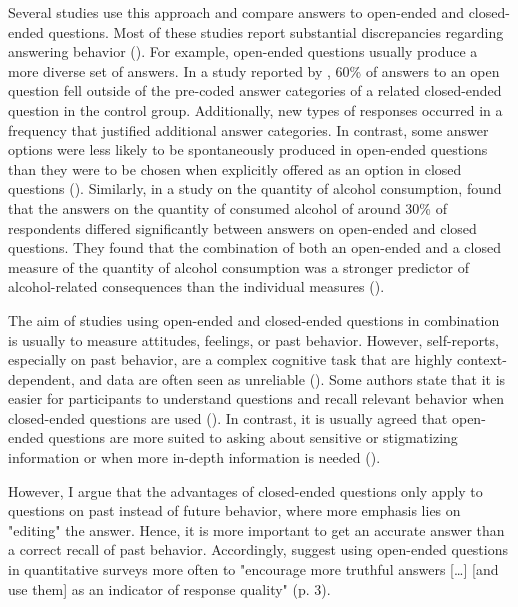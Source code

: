 \documentclass[twocolumn, serif, empirical, authordate]{jote-article}
\begin{document}
Several studies use this approach and compare answers to open-ended and closed-ended questions. Most of these studies report substantial discrepancies regarding answering behavior (). For example, open-ended questions usually produce a more diverse set of answers. In a study reported by \textcite{Schuman1979}, 60\% of answers to an open question fell outside of the pre-coded answer categories of a related closed-ended question in the control group. Additionally, new types of responses occurred in a frequency that justified additional answer categories. In contrast, some answer options were less likely to be spontaneously produced in open-ended questions than they were to be chosen when explicitly offered as an option in closed questions (). Similarly, in a study on the quantity of alcohol consumption, \textcite{Greenfield2006} found that the answers on the quantity of consumed alcohol of around 30\% of respondents differed significantly between answers on open-ended and closed questions. They found that the combination of both an open-ended and a closed measure of the quantity of alcohol consumption was a stronger predictor of alcohol-related consequences than the individual measures ().

The aim of studies using open-ended and closed-ended questions in combination is usually to measure attitudes, feelings, or past behavior.
However, self-reports, especially on past behavior, are a complex cognitive task that are highly context-dependent, and data are often seen as unreliable (). Some authors state that it is easier for participants to understand questions and recall relevant behavior when closed-ended questions are used (). In contrast, it is usually agreed that open-ended questions are more suited to asking about sensitive or stigmatizing information or when more in-depth information is needed ().

However, I argue that the advantages of closed-ended questions only apply to questions on past instead of future behavior, where more emphasis lies on "editing" the answer. Hence, it is more important to get an accurate answer than a correct recall of past behavior.
Accordingly, \textcite{Singer2017} suggest using open-ended questions in quantitative surveys more often to "encourage more truthful answers {[}\ldots{]} {[}and use them{]} as an indicator of response quality" (p. 3).
\end{document}
